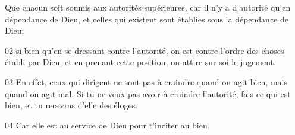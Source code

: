 Que chacun soit soumis aux autorités supérieures, car il n’y a d’autorité qu’en dépendance de Dieu, et celles qui existent sont établies sous la dépendance de Dieu;

02 si bien qu’en se dressant contre l’autorité, on est contre l’ordre des choses établi par Dieu, et en prenant cette position, on attire sur soi le jugement.

03 En effet, ceux qui dirigent ne sont pas à craindre quand on agit bien, mais quand on agit mal. Si tu ne veux pas avoir à craindre l’autorité, fais ce qui est bien, et tu recevras d’elle des éloges.

04 Car elle est au service de Dieu pour t’inciter au bien. 